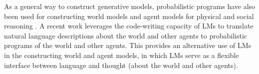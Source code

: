 \documentclass{article}
\newcommand{\hzt}[1]{{\color{red}{[ZT: #1]}}}
\begin{document}
As a general way to construct generative models, probabilistic programs have also been used for constructing world models and agent models for physical \citep[e.g.,][]{gothoskar20213dp3} and social reasoning \citep[e.g.,][]{zhi2020online}. A recent work \citep{wong2023from} leverages the code-writing capacity of LMs to translate natural language descriptions about the world and other agents to probabilistic programs of the world and other agents. This provides an alternative use of LMs in the constructing world and agent models, in which LMs serve as a flexible interface between language and thought (about the world and other agents).





\end{document}
